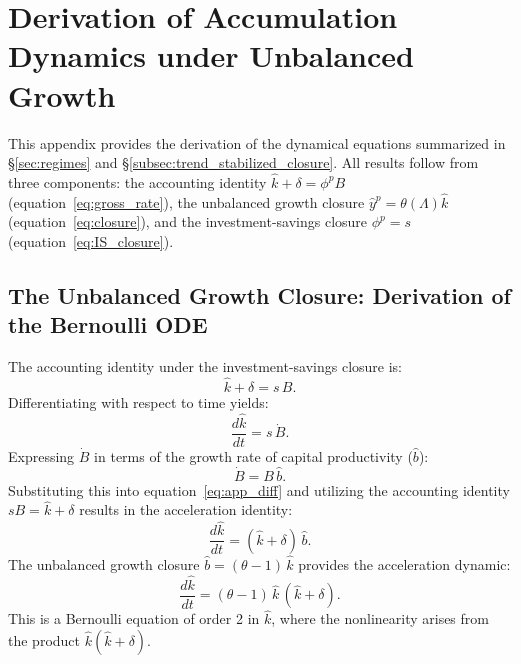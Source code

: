 \section{Derivation of Accumulation Dynamics under Unbalanced Growth}
\label{app:acc_dynamics}

This appendix provides the derivation of the dynamical equations summarized in \S\ref{sec:regimes} and \S\ref{subsec:trend_stabilized_closure}. All results follow from three components: the accounting identity $\hat{k} + \delta = \phi^p B$ (equation~\ref{eq:gross_rate}), the unbalanced growth closure $\hat{y}^p = \theta(\Lambda)\hat{k}$ (equation~\ref{eq:closure}), and the investment-savings closure $\phi^p = s$ (equation~\ref{eq:IS_closure}).

\subsection{The Unbalanced Growth Closure: Derivation of the Bernoulli ODE}
\label{app:bernoulli}

The accounting identity under the investment-savings closure is:
\begin{equation}\label{eq:app_identity}
    \hat{k} + \delta = s \, B.
\end{equation}
Differentiating with respect to time yields:
\begin{equation}\label{eq:app_diff}
    \frac{d\hat{k}}{dt} = s \, \dot{B}.
\end{equation}
Expressing $\dot{B}$ in terms of the growth rate of capital productivity ($\hat{b}$):
\begin{equation}\label{eq:app_Bdot}
    \dot{B} = B \, \hat{b}.
\end{equation}
Substituting this into equation~\eqref{eq:app_diff} and utilizing the accounting identity $sB = \hat{k} + \delta$ results in the acceleration identity:
\begin{equation}\label{eq:app_chain}
    \frac{d\hat{k}}{dt} = (\hat{k} + \delta) \, \hat{b}.
\end{equation}
The unbalanced growth closure $\hat{b} = (\theta - 1) \, \hat{k}$ provides the acceleration dynamic:
\begin{equation}\label{eq:app_bernoulli}
    \boxed{\frac{d\hat{k}}{dt} = (\theta - 1) \, \hat{k} \, (\hat{k} + \delta)}.
\end{equation}
This is a Bernoulli equation of order 2 in $\hat{k}$, where the nonlinearity arises from the product $\hat{k}(\hat{k} + \delta)$.

